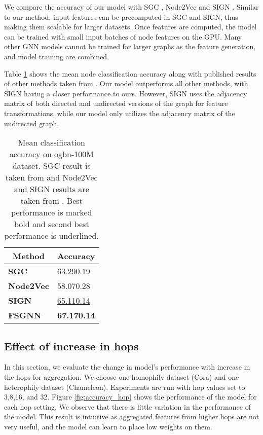 \documentclass[sigconf,natbib=false]{acmart}
\begin{document}
We compare the accuracy of our model with SGC \cite{wu_simplifying_2019},  Node2Vec \cite{grover_node2vec_2016} and SIGN \cite{frasca_sign_2020}. Similar to our method, input features can be precomputed in SGC and SIGN, thus making them scalable for larger datasets. Once features are computed, the model can be trained with small input batches of node features on the GPU. Many other GNN models cannot be trained for larger graphs as the feature generation, and model training are combined. 

Table \ref{tab:scalability_result} shows the mean node classification accuracy along with published results of other methods taken from \cite{frasca_sign_2020}\cite{hu_open_2021}. Our model outperforms all other methods, with SIGN having a closer performance to ours. However, SIGN uses the adjacency matrix of both directed and undirected versions of the graph for feature transformations, while our model only utilizes the adjacency matrix of the undirected graph.




\begin{table}[h]
\centering
\caption{Mean classification accuracy on ogbn-100M dataset. SGC result is taken from \cite{hu_open_2021} and Node2Vec and SIGN results are taken from \cite{frasca_sign_2020}. Best performance is marked bold and second best performance is underlined.}
\label{tab:scalability_result}
\begin{tabular}{ll} 
\toprule
\multicolumn{1}{c}{\textbf{Method}} & \multicolumn{1}{c}{\textbf{Accuracy}}  \\ 
\hline
\textbf{SGC}                        & 63.290.19                                        \\
\textbf{Node2Vec}                   & 58.070.28                                        \\
\textbf{SIGN}                       & \uline{65.110.14}                                \\
\textbf{FSGNN}                      & \textbf{67.170.14}                               \\
\bottomrule
\end{tabular}
\end{table}

\subsection{ Effect of increase in hops }

In this section, we evaluate the change in model's performance with increase in the hops for aggregation. We choose one homophily dataset (Cora) and one heterophily dataset (Chameleon). Experiments are run with hop values set to 3,8,16, and 32. Figure \ref{fig:accuracy_hop} shows the performance of the model for each hop setting. We observe that there is little variation in the performance of the model. This result is intuitive as aggregated features from higher hops are not very useful, and the model can learn to place low weights on them. 
\end{document}
